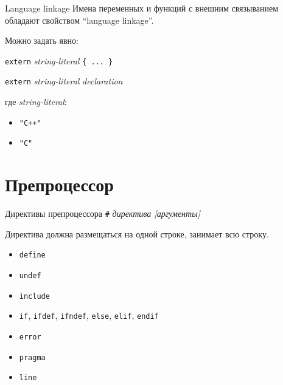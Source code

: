 \documentclass[unknownkeysallowed,xcolor=table]{beamer}
\begin{document}
\begin{frame}[fragile]{Language linkage}
  Имена переменных и функций с внешним связыванием обладают свойством ``language linkage''.

  \vspace{1em}

  Можно задать явно: \\

  \vspace{0.7em}

  \lstinline{extern} \emph{string-literal} \lstinline|{ ... }|

  \lstinline{extern} \emph{string-literal} \emph{declaration}

  \vspace{1em}

  где \emph{string-literal}:

  \begin{itemize}
    \item \lstinline{"C++"}
    \item \lstinline{"C"}
  \end{itemize}
\end{frame}

\section{Препроцессор}

\begin{frame}[fragile]{Директивы препроцессора}
  \lstinline{#} \emph{директива [аргументы]}

  \vspace{1em}

  Директива должна размещаться на одной строке, занимает всю строку.

  \begin{itemize}
    \item \lstinline{define}
    \item \lstinline{undef}
    \item \lstinline{include}
    \item \lstinline{if}, \lstinline{ifdef}, \lstinline{ifndef}, \lstinline{else}, \lstinline{elif}, \lstinline{endif}
    \item \lstinline{error}
    \item \lstinline{pragma}
    \item \lstinline{line}
  \end{itemize}
\end{frame}
\end{document}
